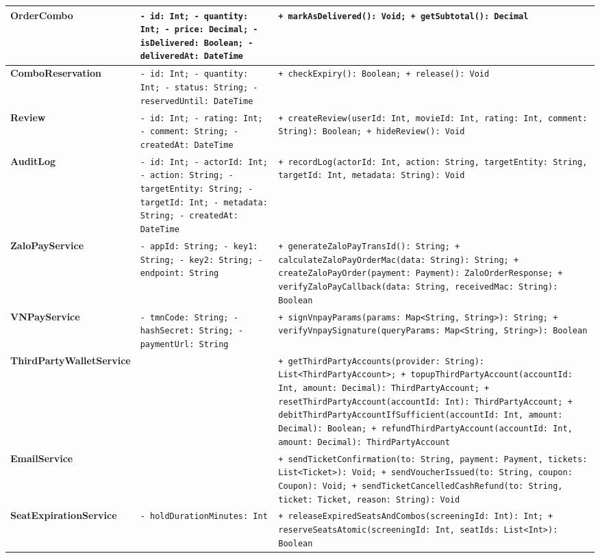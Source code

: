 \begin{longtable}{|p{3.2cm}|p{6.2cm}|p{6.1cm}|}
\textbf{OrderCombo} & \texttt{\small - id: Int; - quantity: Int; - price: Decimal; - isDelivered: Boolean; - deliveredAt: DateTime} & \texttt{\small + markAsDelivered(): Void; + getSubtotal(): Decimal} \\ \hline
\textbf{ComboReservation} & \texttt{\small - id: Int; - quantity: Int; - status: String; - reservedUntil: DateTime} & \texttt{\small + checkExpiry(): Boolean; + release(): Void} \\ \hline
\textbf{Review} & \texttt{\small - id: Int; - rating: Int; - comment: String; - createdAt: DateTime} & \texttt{\small + createReview(userId: Int, movieId: Int, rating: Int, comment: String): Boolean; + hideReview(): Void} \\ \hline
\textbf{AuditLog} & \texttt{\small - id: Int; - actorId: Int; - action: String; - targetEntity: String; - targetId: Int; - metadata: String; - createdAt: DateTime} & \texttt{\small + recordLog(actorId: Int, action: String, targetEntity: String, targetId: Int, metadata: String): Void} \\ \hline
\textbf{ZaloPayService} & \texttt{\small - appId: String; - key1: String; - key2: String; - endpoint: String} & \texttt{\small + generateZaloPayTransId(): String; + calculateZaloPayOrderMac(data: String): String; + createZaloPayOrder(payment: Payment): ZaloOrderResponse; + verifyZaloPayCallback(data: String, receivedMac: String): Boolean} \\ \hline
\textbf{VNPayService} & \texttt{\small - tmnCode: String; - hashSecret: String; - paymentUrl: String} & \texttt{\small + signVnpayParams(params: Map<String, String>): String; + verifyVnpaySignature(queryParams: Map<String, String>): Boolean} \\ \hline
\textbf{ThirdPartyWalletService} & \texttt{\small } & \texttt{\small + getThirdPartyAccounts(provider: String): List<ThirdPartyAccount>; + topupThirdPartyAccount(accountId: Int, amount: Decimal): ThirdPartyAccount; + resetThirdPartyAccount(accountId: Int): ThirdPartyAccount; + debitThirdPartyAccountIfSufficient(accountId: Int, amount: Decimal): Boolean; + refundThirdPartyAccount(accountId: Int, amount: Decimal): ThirdPartyAccount} \\ \hline
\textbf{EmailService} & \texttt{\small } & \texttt{\small + sendTicketConfirmation(to: String, payment: Payment, tickets: List<Ticket>): Void; + sendVoucherIssued(to: String, coupon: Coupon): Void; + sendTicketCancelledCashRefund(to: String, ticket: Ticket, reason: String): Void} \\ \hline
\textbf{SeatExpirationService} & \texttt{\small - holdDurationMinutes: Int} & \texttt{\small + releaseExpiredSeatsAndCombos(screeningId: Int): Int; + reserveSeatsAtomic(screeningId: Int, seatIds: List<Int>): Boolean} \\ \hline
\end{longtable}
